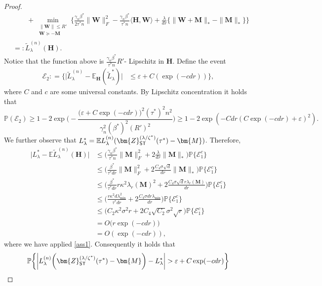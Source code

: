 \documentclass[10pt]{article}
\newcommand{\eps}{\ensuremath{\varepsilon}}
\newcommand{\s}{^*}
\newcommand{\p}{\mathbb{P}}
\renewcommand{\tilde}{\widetilde}
\theoremstyle{definition}
\begin{document}
\begin{proof}
\begin{align}
    &\qquad + \min_{\substack{\| \bm{W} \| \leq R'\\ \bm{W} \succcurlyeq - \bm{M}}} \bigg\{ \frac{\gamma_n \beta\s}{2\tau\s n} \| \bm{W} \|_F^2- \frac{\gamma_n \beta\s}{ \tau\s n} \langle \bm{H},\bm{W} \rangle + \frac{\lambda}{dr} \big\{ \| \bm{W} + \bm{M} \|_* - \| \bm{M} \|_* \big\} \bigg\} \\
    &=: \tilde L_{\lambda}^{(n)}(\bm{H}).
\end{align}
Notice that the function above is $\frac{\gamma_n \beta\s}{\tau\s n} R'$- Lipschitz in $\bm{H}$.  Define the event
\begin{align}
    \mathcal{E}_2: =  \bigg\{\bigg|    \tilde L_{\lambda}^{(n)} - \mathbb{E}_{\bm{H}} ( \tilde L_{\lambda}^* )\bigg| &\leq \eps + C (\exp( - c dr))  \bigg\},
\end{align}
where $C$ and $c$ are some universal constants.  
By Lipschitz concentration it holds that $$\p(\mathcal{E}_2) \geq 1 -2 \exp \big( - \frac{ (\eps + C \exp(- c dr) \big) ^2 (\tau\s)^2 n^2}{\gamma_n^2 (\beta\s)^2 (R')^2} ) \geq 1 - 2\exp( - C d r( C \exp(- c dr) + \eps)^2 ).$$  We further observe that $L_{\lambda}\s = \mathbb{E}  L_{\lambda}^{(n)}(\bm{Z}_{{\sf ST}}^{(\lambda/\zeta\s)}(\tau\s) - \bm{M} )$.  Therefore,
\begin{align}
\bigg|    L_{\lambda}\s - \mathbb{E} \tilde L_{\lambda}^{(n)} (\bm{H}) \bigg| &\leq \bigg(\frac{\gamma_n \beta\s}{\tau\s n} \| \bm{M} \|_F^2 + 2\frac{\lambda}{dr} \| \bm{M} \|_* \bigg) \p\big\{ \mathcal{E}_1^c \big\} \\
&\leq \bigg( \frac{\beta\s}{\tau\s dr}\|\bm{M} \|_F^2 + 2 \frac{C_4 \sigma \sqrt{d}}{dr} \| \bm{M}\|_* \bigg) \p\big\{ \mathcal{E}_1^c \big\} \\
&\leq \bigg( \frac{\beta\s}{\tau\s dr} r \kappa^2 \lambda_{r}(\bm{M})^2  + 2 \frac{C_4 \sigma \sqrt{d} r \lambda_r(\bm{M})}{dr} \bigg) \p\big\{ \mathcal{E}_1^c \big\} \\
&\leq \bigg( \frac{r \kappa^2 d \lambda_{\min}^2}{\tau\s dr}   + 2 \frac{C_4 \sigma d r \lambda_{\min}}{dr} \bigg) \p\big\{ \mathcal{E}_1^c \big\} \\
&\leq \bigg( C_2 \kappa^2 \sigma^2 r + 2 C_4 \sqrt{C_2} \sigma^2 \sqrt{r} \bigg) \p\big\{ \mathcal{E}_1^c \big\} \\
&= O\bigg( r \exp( - c dr ) \bigg) \\
&= O( \exp( - c dr)),
\end{align}
where we have applied \cref{ass1}.  Consequently it holds that
\begin{align}
\p\bigg\{ \bigg|    &L_{\lambda}^{(n)} \bigg( \bm{Z}_{{\sf ST}}^{(\lambda/\zeta\s)}(\tau\s) - \bm{M} \bigg) - L_{\lambda}^* \bigg| > \eps + C \exp( - c d r) \bigg\} \\

\end{align}
\end{proof}
\end{document}
